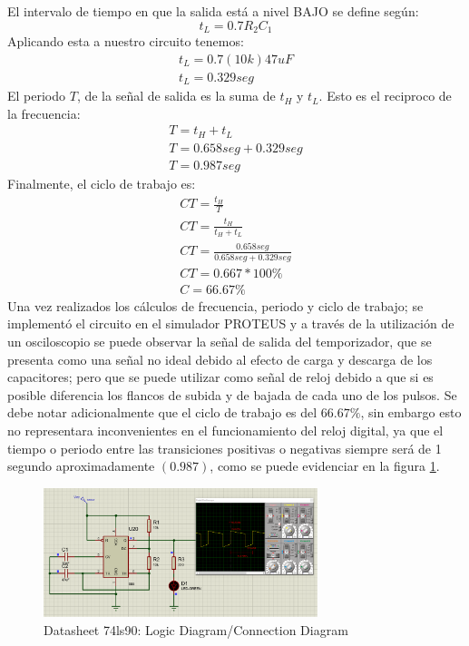 \documentclass[journal]{IEEEtran}
\begin{document}
El intervalo de tiempo en que la salida está a nivel BAJO se define según:
\[
    t_{L}=0.7R_{2}C_{1}
\] 
Aplicando esta a nuestro circuito tenemos:
\[\begin{array}{crl}
    t_{L}=0.7\left ( 10k \right )47uF
    \\ 
    t_{L}=0.329 seg
\end{array}\]
El periodo $T$, de la señal de salida es la suma de $t_{H}$   y  $t_{L}$.  Esto es el reciproco de la frecuencia:
\[\begin{array}{crl}
    T=t_{H}+t_{L}
    \\
    T=0.658seg+0.329seg
    \\
    T=0.987seg
\end{array}\]
Finalmente, el ciclo de trabajo es:
\[\begin{array}{crl}
    CT=\frac{t_{H}}{T}
    \\
    CT=\frac{t_{H}}{t_{H}+t_{L}}
    \\
    CT=\frac{0.658seg}{0.658seg+0.329seg}
    \\
    CT=0.667*100\%
    \\
    C=66.67\%
\end{array}
\]
Una vez realizados los cálculos de frecuencia, periodo y ciclo de trabajo; se implementó el circuito en el simulador PROTEUS y a través de la utilización de un osciloscopio se puede observar la señal de salida del  temporizador, que se presenta como una señal no ideal debido al efecto de carga y descarga de los capacitores; pero que se puede utilizar como señal de reloj debido a que si es posible diferencia los flancos de subida y de bajada de cada uno de los pulsos.
Se debe notar adicionalmente que el ciclo de trabajo es del $66.67\%$, sin embargo esto no representara  inconvenientes  en  el  funcionamiento  del  reloj  digital,  ya  que  el  tiempo  o periodo  entre  las  transiciones  positivas  o  negativas  siempre  será  de  1  segundo aproximadamente $\left ( 0.987 \right )$, como se puede evidenciar en la figura \ref{osiloscop_sim}.

\begin{figure}[htb]
    \centering
    \includegraphics[width=8cm]{images/image3.png}
    \caption{Datasheet 74ls90: Logic Diagram/Connection Diagram}
    \label{osiloscop_sim}
\end{figure}
\end{document}

